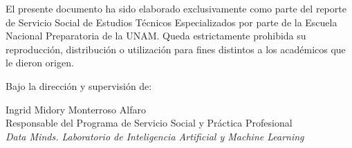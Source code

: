 \documentclass{article}
\begin{document}
\newpage

El presente documento ha sido elaborado exclusivamente como parte del reporte de Servicio Social de Estudios Técnicos Especializados por parte de la Escuela Nacional Preparatoria de la UNAM. Queda estrictamente prohibida su reproducción, distribución o utilización para fines distintos a los académicos que le dieron origen.

Bajo la dirección y supervisión de:


\begin{center}
\vspace{5cm}
   Ingrid Midory Monterroso Alfaro \\
Responsable del Programa de Servicio Social y Práctica Profesional\\  
\textit{Data Minds. Laboratorio de Inteligencia Artificial y Machine Learning} 
\end{center}
\end{document}
